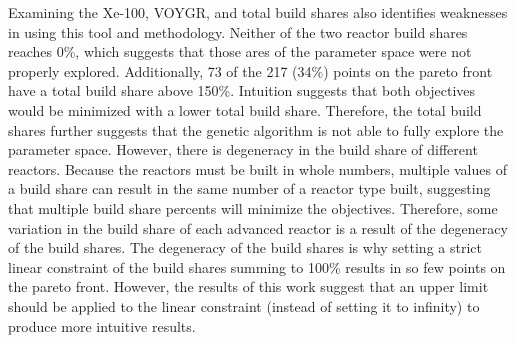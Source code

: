 Examining the Xe-100, VOYGR, and total build shares also identifies 
weaknesses in using this tool and methodology. Neither of the two reactor 
build shares reaches 0\%, which suggests that those ares of the parameter 
space were not properly explored. Additionally, 73 of the 217 (34\%) points 
on the pareto front have a total build share above 150\%. Intuition 
suggests that both objectives would be minimized with a lower total 
build share. Therefore, the total build shares further suggests that the 
genetic algorithm is not able to fully explore the parameter space. 
However, there is degeneracy in the build share of different reactors. 
Because the reactors must be built in whole numbers, multiple values of 
a build share can result in the same number of a reactor type built, 
suggesting that multiple build share percents will minimize the 
objectives. Therefore, some variation in the build share of each 
advanced reactor is a result of the degeneracy of the build 
shares. The degeneracy of the build shares is why setting a strict 
linear constraint of the build shares summing to 100\% results in 
so few points on the pareto front. However, the results of this work 
suggest that an upper limit should be applied to the linear constraint 
(instead of setting it to infinity) to produce more intuitive results. 